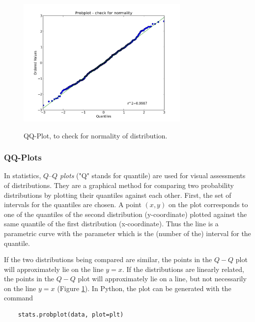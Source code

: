 \begin{figure}
  \centering
  \includegraphics[width=0.75\textwidth]{../Images/ProbPlot.png}\\
  \caption{QQ-Plot, to check for normality of distribution.}\label{fig:qqplot}
\end{figure}


\subsubsection{QQ-Plots} 

 In statistics, \emph{$Q–Q$ plots} ("Q" stands for quantile) are used for visual assessments of distributions. They are a graphical method for comparing two probability distributions by plotting their quantiles against each other. First, the set of intervals for the quantiles are chosen. A point $(x,y)$ on the plot corresponds to one of the quantiles of the second distribution (y-coordinate) plotted against the same quantile of the first distribution (x-coordinate). Thus the line is a parametric curve with the parameter which is the (number of the) interval for the quantile.

If the two distributions being compared are similar, the points in the $Q-Q$ plot will approximately lie on the line $y = x$. If the distributions are linearly related, the points in the $Q-Q$ plot will approximately lie on a line, but not necessarily on the line $y = x$ (Figure \ref{fig:qqplot}). In Python, the plot can be generated with the command

\begin{lstlisting}
    stats.probplot(data, plot=plt)
\end{lstlisting}

